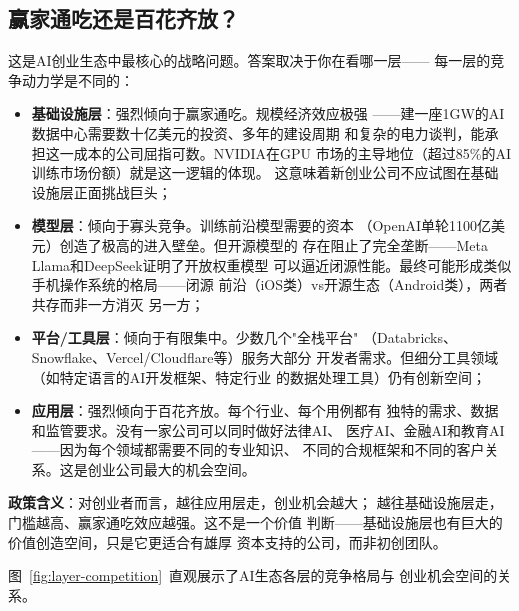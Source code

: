 \subsection{赢家通吃还是百花齐放？}
\label{subsec:outlook-winner-take-all}

这是AI创业生态中最核心的战略问题。答案取决于你在看哪一层——
每一层的竞争动力学是不同的：

\begin{itemize}
  \item \textbf{基础设施层}：强烈倾向于赢家通吃。规模经济效应极强
    ——建一座1GW的AI数据中心需要数十亿美元的投资、多年的建设周期
    和复杂的电力谈判，能承担这一成本的公司屈指可数。NVIDIA在GPU
    市场的主导地位（超过85\%的AI训练市场份额）就是这一逻辑的体现。
    这意味着新创业公司不应试图在基础设施层正面挑战巨头；

  \item \textbf{模型层}：倾向于寡头竞争。训练前沿模型需要的资本
    （OpenAI单轮1100亿美元）创造了极高的进入壁垒。但开源模型的
    存在阻止了完全垄断——Meta Llama和DeepSeek证明了开放权重模型
    可以逼近闭源性能。最终可能形成类似手机操作系统的格局——闭源
    前沿（iOS类）vs开源生态（Android类），两者共存而非一方消灭
    另一方；

  \item \textbf{平台/工具层}：倾向于有限集中。少数几个"全栈平台"
    （Databricks、Snowflake、Vercel/Cloudflare等）服务大部分
    开发者需求。但细分工具领域（如特定语言的AI开发框架、特定行业
    的数据处理工具）仍有创新空间；

  \item \textbf{应用层}：强烈倾向于百花齐放。每个行业、每个用例都有
    独特的需求、数据和监管要求。没有一家公司可以同时做好法律AI、
    医疗AI、金融AI和教育AI——因为每个领域都需要不同的专业知识、
    不同的合规框架和不同的客户关系。这是创业公司最大的机会空间。
\end{itemize}

\textbf{政策含义}：对创业者而言，越往应用层走，创业机会越大；
越往基础设施层走，门槛越高、赢家通吃效应越强。这不是一个价值
判断——基础设施层也有巨大的价值创造空间，只是它更适合有雄厚
资本支持的公司，而非初创团队。

图~\ref{fig:layer-competition}~直观展示了AI生态各层的竞争格局与
创业机会空间的关系。

